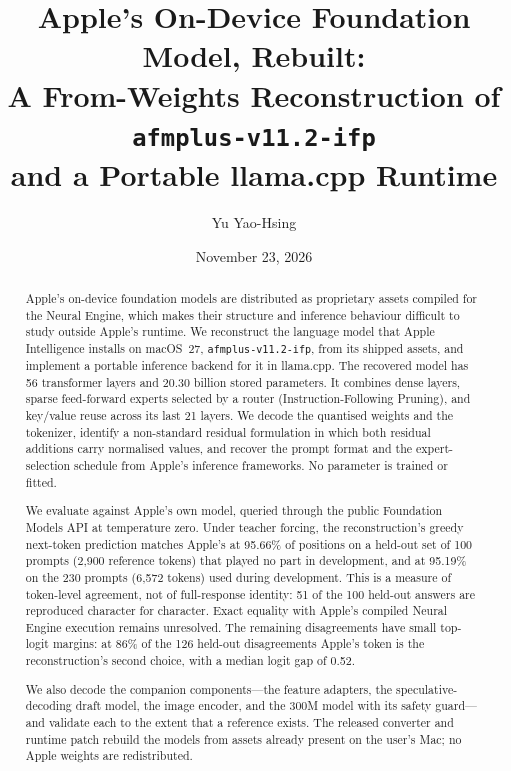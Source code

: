 \documentclass[11pt,reqno]{amsart}
\newcommand{\code}[1]{\texttt{#1}}
\theoremstyle{definition}
\begin{document}
\title[Apple's On-Device Foundation Model, Rebuilt]{Apple's On-Device Foundation Model, Rebuilt:\\
A From-Weights Reconstruction of \code{afmplus-v11.2-ifp}\\ and a Portable llama.cpp Runtime}
\author{Yu Yao-Hsing}
\date{November 23, 2026}

\begin{abstract}
Apple's on-device foundation models are distributed as proprietary assets compiled for the Neural Engine, which makes their structure and inference behaviour difficult to study outside Apple's runtime. We reconstruct the language model that Apple Intelligence installs on macOS~27, \code{afmplus-v11.2-ifp}, from its shipped assets, and implement a portable inference backend for it in llama.cpp. The recovered model has 56 transformer layers and 20.30 billion stored parameters. It combines dense layers, sparse feed-forward experts selected by a router (Instruction-Following Pruning), and key/value reuse across its last 21 layers. We decode the quantised weights and the tokenizer, identify a non-standard residual formulation in which both residual additions carry normalised values, and recover the prompt format and the expert-selection schedule from Apple's inference frameworks. No parameter is trained or fitted.

We evaluate against Apple's own model, queried through the public Foundation Models API at temperature zero. Under teacher forcing, the reconstruction's greedy next-token prediction matches Apple's at 95.66\% of positions on a held-out set of 100 prompts (2{,}900 reference tokens) that played no part in development, and at 95.19\% on the 230 prompts (6{,}572 tokens) used during development. This is a measure of token-level agreement, not of full-response identity: 51 of the 100 held-out answers are reproduced character for character. Exact equality with Apple's compiled Neural Engine execution remains unresolved. The remaining disagreements have small top-logit margins: at 86\% of the 126 held-out disagreements Apple's token is the reconstruction's second choice, with a median logit gap of 0.52.

We also decode the companion components---the feature adapters, the speculative-decoding draft model, the image encoder, and the 300M model with its safety guard---and validate each to the extent that a reference exists. The released converter and runtime patch rebuild the models from assets already present on the user's Mac; no Apple weights are redistributed.
\end{abstract}
\end{document}
